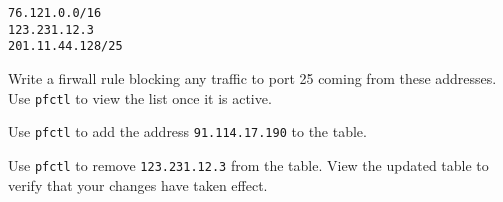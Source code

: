 \documentclass{article}
\begin{document}
\begin{verbatim}
76.121.0.0/16
123.231.12.3
201.11.44.128/25
\end{verbatim}

Write a firwall rule blocking any traffic to port 25 coming from these addresses.  Use \texttt{pfctl} to view the list once it is active.

Use \texttt{pfctl} to add the address \texttt{91.114.17.190} to the table.

Use \texttt{pfctl} to remove \texttt{123.231.12.3} from the table.  View the
updated table to verify that your changes have taken effect.
\end{document}
